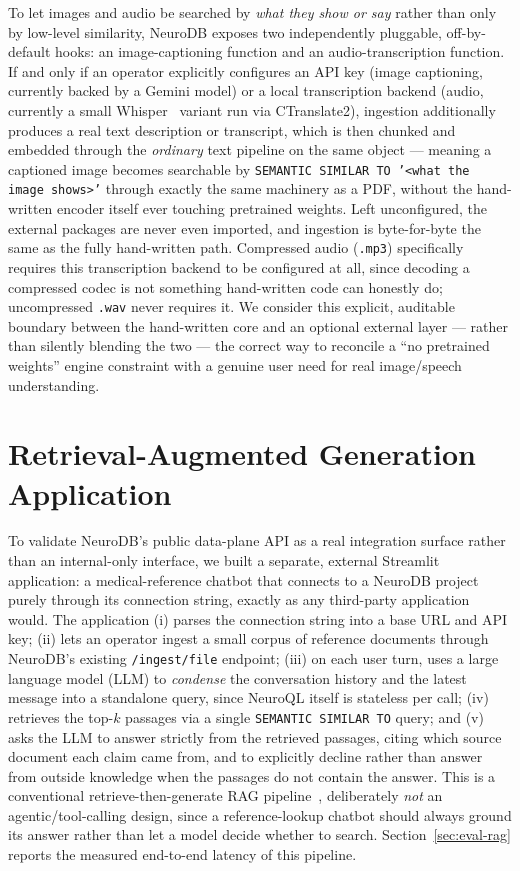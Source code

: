 \documentclass[conference]{IEEEtran}
\begin{document}
To let images and audio be searched by \emph{what they show or say} rather than only by
low-level similarity, NeuroDB exposes two independently pluggable, off-by-default hooks:
an image-captioning function and an audio-transcription function. If and only if an
operator explicitly configures an API key (image captioning, currently backed by a Gemini
model) or a local transcription backend (audio, currently a small
Whisper~\cite{radford2023whisper} variant run via CTranslate2), ingestion additionally
produces a real text description or transcript, which is then chunked and embedded through
the \emph{ordinary} text pipeline on the same object --- meaning a captioned image becomes
searchable by \texttt{SEMANTIC SIMILAR TO '<what the image shows>'} through exactly the same
machinery as a PDF, without the hand-written encoder itself ever touching pretrained
weights. Left unconfigured, the external packages are never even imported, and ingestion is
byte-for-byte the same as the fully hand-written path. Compressed audio (\texttt{.mp3})
specifically requires this transcription backend to be configured at all, since decoding a
compressed codec is not something hand-written code can honestly do; uncompressed
\texttt{.wav} never requires it. We consider this explicit, auditable boundary between the
hand-written core and an optional external layer --- rather than silently blending the two
--- the correct way to reconcile a ``no pretrained weights'' engine constraint with a
genuine user need for real image/speech understanding.

\section{Retrieval-Augmented Generation Application}
\label{sec:ragdemo}

To validate NeuroDB's public data-plane API as a real integration surface rather than an
internal-only interface, we built a separate, external Streamlit application: a
medical-reference chatbot that connects to a NeuroDB project purely through its connection
string, exactly as any third-party application would. The application (i) parses the
connection string into a base URL and API key; (ii) lets an operator ingest a small corpus
of reference documents through NeuroDB's existing \texttt{/ingest/file} endpoint; (iii) on
each user turn, uses a large language model (LLM) to \emph{condense} the conversation
history and the latest message into a standalone query, since NeuroQL itself is stateless
per call; (iv) retrieves the top-$k$ passages via a single \texttt{SEMANTIC SIMILAR TO}
query; and (v) asks the LLM to answer strictly from the retrieved passages, citing which
source document each claim came from, and to explicitly decline rather than answer from
outside knowledge when the passages do not contain the answer. This is a conventional
retrieve-then-generate RAG pipeline~\cite{lewis2020rag}, deliberately \emph{not} an
agentic/tool-calling design, since a reference-lookup chatbot should always ground its
answer rather than let a model decide whether to search. Section~\ref{sec:eval-rag} reports
the measured end-to-end latency of this pipeline.
\end{document}
